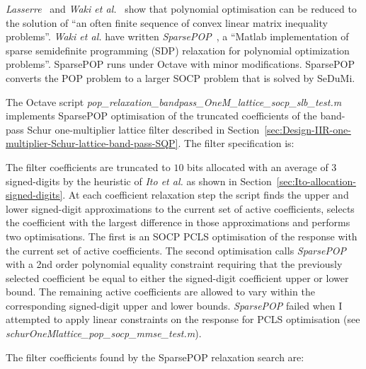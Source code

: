 \documentclass[a4paper,twoside,10pt,english]{report}
\begin{document}
\emph{Lasserre}~\cite{Lasserre_GlobalOptimizationPolynomialsMoments} and 
\emph{Waki et al.}~\cite{Waki_SumsSquaresSDPRelaxationsPolynomialOptSparsity}
show that polynomial optimisation can be reduced to the solution of ``an often 
finite sequence of convex linear matrix inequality problems''. 
\emph{Waki et al.} have written \emph{SparsePOP}~\cite{SparsePOP}, a ``Matlab 
implementation of sparse semidefinite programming (SDP) relaxation for 
polynomial optimization problems''. SparsePOP runs under Octave with minor 
modifications. SparsePOP converts the POP problem to a larger SOCP problem that
is solved by SeDuMi.

The Octave script 
\emph{pop\_relaxation\_bandpass\_OneM\_lattice\_socp\_slb\_test.m} implements
SparsePOP optimisation of the truncated coefficients of the band-pass 
Schur one-multiplier lattice filter described in
Section~\ref{sec:Design-IIR-one-multiplier-Schur-lattice-band-pass-SQP}.
The filter specification is:
\begin{small}

\end{small} 

The filter coefficients are truncated to $10$ bits allocated with an average
of $3$ signed-digits by the heuristic of \emph{Ito et al.} as shown in
Section~\ref{sec:Ito-allocation-signed-digits}. At each coefficient relaxation
step the script finds the upper and lower signed-digit approximations to the
current set of active coefficients, selects the coefficient with the largest
difference in those approximations and performs two optimisations. The first
is an SOCP PCLS optimisation of the response with the current set of active
coefficients. The second optimisation calls \emph{SparsePOP} with a 2nd order
polynomial equality constraint requiring that the previously selected
coefficient be equal to either the signed-digit coefficient upper or lower
bound. The remaining active coefficients are allowed to vary within the
corresponding signed-digit upper and lower bounds. \emph{SparsePOP} failed
when I attempted to apply linear constraints on the response for PCLS
optimisation (see \emph{schurOneMlattice\_pop\_socp\_mmse\_test.m}).

The filter coefficients found by the SparsePOP relaxation search are:
\begin{small}


\end{small}
\end{document}
